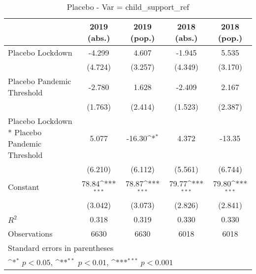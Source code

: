 \documentclass{article}
\begin{document}
{
\def\sym#1{\ifmmode^{#1}\else\(^{#1}\)\fi}
\begin{longtable}{l*{4}{c}}
\caption{Placebo - Var = child\_support\_ref}\\
\hline\hline\endfirsthead\hline\endhead\hline\endfoot\endlastfoot
                &\multicolumn{1}{c}{2019 (abs.)}&\multicolumn{1}{c}{2019 (pop.)}&\multicolumn{1}{c}{2018 (abs.)}&\multicolumn{1}{c}{2018 (pop.)}\\
\hline
Placebo Lockdown&   -4.299         &    4.607         &   -1.945         &    5.535         \\
                &  (4.724)         &  (3.257)         &  (4.349)         &  (3.170)         \\
Placebo Pandemic Threshold&   -2.780         &    1.628         &   -2.409         &    2.167         \\
                &  (1.763)         &  (2.414)         &  (1.523)         &  (2.387)         \\
Placebo Lockdown * Placebo Pandemic Threshold&    5.077         &   -16.30\sym{*}  &    4.372         &   -13.35         \\
                &  (6.210)         &  (6.112)         &  (5.561)         &  (6.744)         \\
Constant        &    78.84\sym{***}&    78.87\sym{***}&    79.77\sym{***}&    79.80\sym{***}\\
                &  (3.042)         &  (3.073)         &  (2.826)         &  (2.841)         \\
\hline
\(R^{2}\)       &    0.318         &    0.319         &    0.330         &    0.330         \\
Observations    &     6630         &     6630         &     6018         &     6018         \\
\hline\hline
\multicolumn{5}{l}{\footnotesize Standard errors in parentheses}\\
\multicolumn{5}{l}{\footnotesize \sym{*} \(p<0.05\), \sym{**} \(p<0.01\), \sym{***} \(p<0.001\)}\\
\end{longtable}
}
\end{document}
